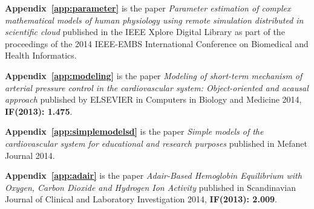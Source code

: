 \textbf{Appendix~\ref{app:parameter}} is the paper \cite{Kulhanek2014Parameters} \emph{Parameter estimation of complex mathematical models of human physiology using remote simulation distributed in scientific cloud} published in the IEEE Xplore Digital Library as part of the proceedings of the 2014 IEEE-EMBS International Conference on Biomedical and Health Informatics.

\textbf{Appendix~\ref{app:modeling}} is the paper \cite{Kulhanek2014Modeling} \emph{Modeling of short-term mechanism of arterial pressure control in the cardiovascular system: Object-oriented and acausal approach} published by ELSEVIER in Computers in Biology and Medicine 2014, \textbf{IF(2013): 1.475}.

\textbf{Appendix~\ref{app:simplemodelsd}} is the paper \cite{Kulhanek2014mefanet} \emph{Simple models of the cardiovascular system for educational and research purposes} published in Mefanet Journal 2014.

\textbf{Appendix~\ref{app:adair}} is the paper \cite{Matejak2014sj} \emph{Adair-Based Hemoglobin Equilibrium with Oxygen, Carbon Dioxide and Hydrogen Ion Activity} published in Scandinavian Journal of Clinical and Laboratory Investigation 2014, \textbf{IF(2013): 2.009}.

